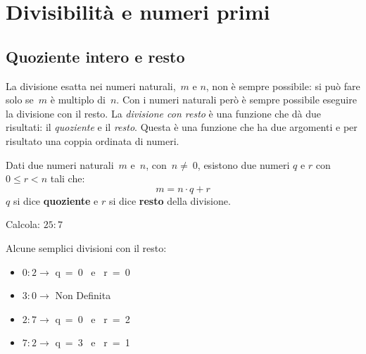 \section{Divisibilità e numeri primi}
\label{sec:nat_divsibilita}

\subsection{Quoziente intero e resto}

La divisione esatta nei numeri naturali,~\(m\) e
\(n\), non è sempre possibile: 
si può fare solo se~\(m\) è multiplo di~\(n\).
Con i numeri naturali però è sempre possibile eseguire la divisione con il 
resto. La \emph{divisione con resto} è una funzione che dà due risultati:
il \emph{quoziente} e il \emph{resto}. 
Questa è una funzione che ha due argomenti e per risultato una coppia 
ordinata di numeri.

\begin{definizione}{}{}
Dati due numeri naturali~\(m\) e~\(n\), con~\(n\neq~0\), 
esistono due numeri \(q\) e \(r\) con \(0 \leqslant r < n\) 
tali che: 
\[m = n \cdot q + r\] 
\(q\) si dice \textbf{quoziente} e \(r\) si dice \textbf{resto} della 
divisione.
\end{definizione}

\begin{esempio}{}{} 
Calcola: \(25:7\)

\end{esempio}

\begin{esempio}{}{}
Alcune semplici divisioni con il resto:
\vspace{-1em}
\begin{htmulticols}{2}
\begin{itemize} [leftmargin=0cm, itemindent=.5cm, noitemsep]
\item \(0 : 2 \rightarrow\) \quad q~=~0 ~e~ r~=~0
\item \(3 : 0 \rightarrow\) \quad Non Definita
\item \(2 : 7 \rightarrow\) \quad q~=~0 ~e~ r~=~2
\item \(7 : 2 \rightarrow\) \quad q~=~3 ~e~ r~=~1
\end{itemize}
\end{htmulticols}
\end{esempio}

